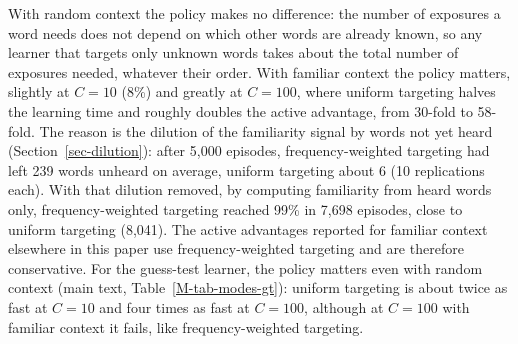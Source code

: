 \documentclass[11pt]{article}
\begin{document}
\begin{table}[h]
\centering
\caption{\label{tab-policy} Mean episodes to learn 99\% of the vocabulary, eliminative learner, under frequency-weighted and uniform active target selection, and the corresponding speedups over passive selection in the same set of runs.}
\small
{}
\end{table}

With random context the policy makes no difference: the number of exposures a word needs does not depend on which other words are already known, so any learner that targets only unknown words takes about the total number of exposures needed, whatever their order. With familiar context the policy matters, slightly at $C=10$ (8\%) and greatly at $C=100$, where uniform targeting halves the learning time and roughly doubles the active advantage, from 30-fold to 58-fold. The reason is the dilution of the familiarity signal by words not yet heard (Section~\ref{sec-dilution}): after 5,000 episodes, frequency-weighted targeting had left 239 words unheard on average, uniform targeting about 6 (10 replications each). With that dilution removed, by computing familiarity from heard words only, frequency-weighted targeting reached 99\% in 7,698 episodes, close to uniform targeting (8,041). The active advantages reported for familiar context elsewhere in this paper use frequency-weighted targeting and are therefore conservative. For the guess-test learner, the policy matters even with random context (main text, Table~\ref{M-tab-modes-gt}): uniform targeting is about twice as fast at $C=10$ and four times as fast at $C=100$, although at $C=100$ with familiar context it fails, like frequency-weighted targeting.
\end{document}
